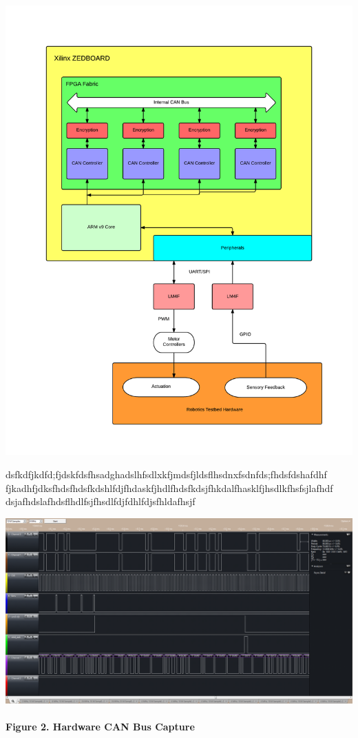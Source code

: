 \documentclass[a0,landscape]{a0poster}
\begin{document}
\begin{multicols}{3}
\centerline{\includegraphics[scale=0.9]{fpga_layout}}
dsfkdfjkdfd;fjdskfdsfhsadghadslhfsdlxkfjmdsfjldsflhsdnxfsdnfds;fhdsfdshafdhf
fjkadhfjdksfhdsfhdsfkdshlfdjfhdaskfjhdlfhdsfkdsjfhkdalfhasklfjhsdlkfhsfsjlafhdf
dsjafhdslafhdsflhdlfsjfhsdlfdjfdhlfdjsfhldafhsjf

\includegraphics[width=0.9\linewidth]{UART-CAN_PacketTranslation}
\\
\\
\bf{Figure 2. } Hardware CAN Bus Capture


\end{multicols}
\end{document}
